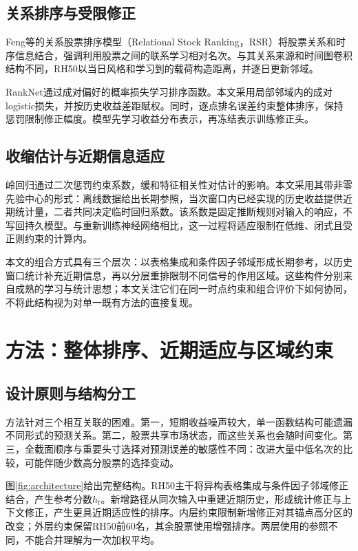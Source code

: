 \documentclass[UTF8,11pt,a4paper,fontset=fandol]{ctexart}
\begin{document}
\subsection{关系排序与受限修正}
Feng等\cite{feng2019}的关系股票排序模型（Relational Stock Ranking，RSR）将股票关系和时序信息结合，强调利用股票之间的联系学习相对名次。与其关系来源和时间图卷积结构不同，RH50以当日风格和学习到的载荷构造距离，并逐日更新邻域。

RankNet\cite{burges2005}通过成对偏好的概率损失学习排序函数。本文采用局部邻域内的成对logistic损失，并按历史收益差距赋权。同时，逐点排名误差约束整体排序，保持惩罚限制修正幅度。模型先学习收益分布表示，再冻结表示训练修正头。

\subsection{收缩估计与近期信息适应}
岭回归通过二次惩罚约束系数，缓和特征相关性对估计的影响\cite{hoerl1970}。本文采用其带非零先验中心的形式：离线数据给出长期参照，当次窗口内已经实现的历史收益提供近期统计量，二者共同决定临时回归系数。该系数是固定推断规则对输入的响应，不写回持久模型。与重新训练神经网络相比，这一过程将适应限制在低维、闭式且受正则约束的计算内。

本文的组合方式具有三个层次：以表格集成和条件因子邻域形成长期参考，以历史窗口统计补充近期信息，再以分层重排限制不同信号的作用区域。这些构件分别来自成熟的学习与统计思想；本文关注它们在同一时点约束和组合评价下如何协同，不将此结构视为对单一既有方法的直接复现。

\section{方法：整体排序、近期适应与区域约束}
\subsection{设计原则与结构分工}
方法针对三个相互关联的困难。第一，短期收益噪声较大，单一函数结构可能遗漏不同形式的预测关系。第二，股票共享市场状态，而这些关系也会随时间变化。第三，全截面顺序与重要头寸选择对预测误差的敏感性不同：改进大量中低名次的比较，可能伴随少数高分股票的选择变动。

图\ref{fig:architecture}给出完整结构。RH50主干将异构表格集成与条件因子邻域修正结合，产生参考分数$h_t$。新增路径从同次输入中重建近期历史，形成统计修正与上下文修正，产生更具近期适应性的排序。内层约束限制新增修正对其锚点高分区的改变；外层约束保留RH50前60名，其余股票使用增强排序。两层使用的参照不同，不能合并理解为一次加权平均。
\end{document}
